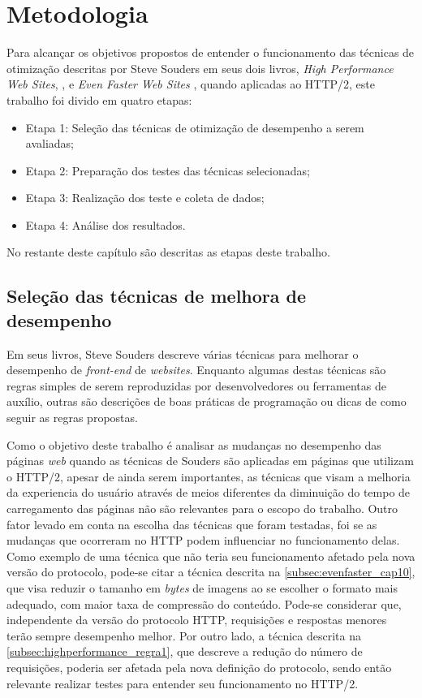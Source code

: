 %
%

\chapter{Metodologia}
\label{chap:metodologia}

Para alcançar os objetivos propostos de entender o funcionamento das técnicas de otimização descritas por Steve Souders em seus dois livros, \textit{High Performance Web Sites}, \cite{HighPerformance}, e \textit{Even Faster Web Sites} \cite{EvenFaster}, quando aplicadas ao HTTP/2, este trabalho foi divido em quatro etapas:

\begin{itemize}
	\item Etapa 1: Seleção das técnicas de otimização de desempenho a serem avaliadas;
	\item Etapa 2: Preparação dos testes das técnicas selecionadas;
	\item Etapa 3: Realização dos teste e coleta de dados;
	\item Etapa 4: Análise dos resultados.
\end{itemize}

No restante deste capítulo são descritas as etapas deste trabalho.

\section{Seleção das técnicas de melhora de desempenho}
\label{sec:selecaodastecnicasdemelhoradedesempenho}

Em seus livros, Steve Souders descreve várias técnicas para melhorar o desempenho de \textit{front-end} de \textit{websites}. Enquanto algumas destas técnicas são regras simples de serem reproduzidas por desenvolvedores ou ferramentas de auxílio, outras são descrições de boas práticas de programação ou dicas de como seguir as regras propostas.

Como o objetivo deste trabalho é analisar as mudanças no desempenho das páginas \textit{web} quando as técnicas de Souders são aplicadas em páginas que utilizam o HTTP/2, apesar de ainda serem importantes, as técnicas que visam a melhoria da experiencia do usuário através de meios diferentes da diminuição do tempo de carregamento das páginas não são relevantes para o escopo do trabalho. Outro fator levado em conta na escolha das técnicas que foram testadas, foi se as mudanças que ocorreram no HTTP podem influenciar no funcionamento delas. Como exemplo de uma técnica que não teria seu funcionamento afetado pela nova versão do protocolo, pode-se citar a técnica descrita na \autoref{subsec:evenfaster_cap10}, que visa reduzir o tamanho em \textit{bytes} de imagens ao se escolher o formato mais adequado, com maior taxa de compressão do conteúdo. Pode-se considerar que, independente da versão do protocolo HTTP, requisições e respostas menores terão sempre desempenho melhor. Por outro lado, a técnica descrita na \autoref{subsec:highperformance_regra1}, que descreve a redução do número de requisições, poderia ser afetada pela nova definição do protocolo, sendo então relevante realizar testes para entender seu funcionamento no HTTP/2.


